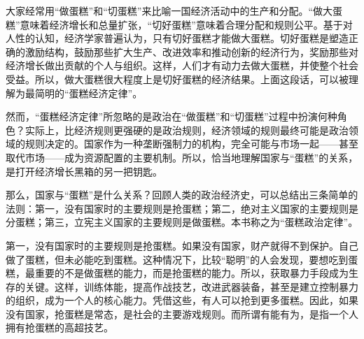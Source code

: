 





大家经常用“做蛋糕”和“切蛋糕”来比喻一国经济活动中的生产和分配。“做大蛋糕”意味着经济增长和总量扩张，“切好蛋糕”意味着合理分配和规则公平。基于对人性的认知，经济学家普遍认为，只有切好蛋糕才能做大蛋糕。切好蛋糕是塑造正确的激励结构，鼓励那些扩大生产、改进效率和推动创新的经济行为，奖励那些对经济增长做出贡献的个人与组织。这样，人们才有动力去做大蛋糕，并使整个社会受益。所以，做大蛋糕很大程度上是切好蛋糕的经济结果。上面这段话，可以被理解为最简明的“蛋糕经济定律”。

然而，“蛋糕经济定律”所忽略的是政治在“做蛋糕”和“切蛋糕”过程中扮演何种角色？实际上，比经济规则更强硬的是政治规则，经济领域的规则最终可能是政治领域的规则决定的。国家作为一种垄断强制力的机构，完全可能与市场一起——甚至取代市场——成为资源配置的主要机制。所以，恰当地理解国家与“蛋糕”的关系，是打开经济增长黑箱的另一把钥匙。

那么，国家与“蛋糕”是什么关系？回顾人类的政治经济史，可以总结出三条简单的法则：第一，没有国家时的主要规则是抢蛋糕；第二，绝对主义国家的主要规则是分蛋糕；第三，立宪主义国家的主要规则是做蛋糕。本书称之为“蛋糕政治定律”。

第一，没有国家时的主要规则是抢蛋糕。如果没有国家，财产就得不到保护。自己做了蛋糕，但未必能吃到蛋糕。这种情况下，比较“聪明”的人会发现，要想吃到蛋糕，最重要的不是做蛋糕的能力，而是抢蛋糕的能力。所以，获取暴力手段成为生存的关键。这样，训练体能，提高作战技艺，改进武器装备，甚至是建立控制暴力的组织，成为一个人的核心能力。凭借这些，有人可以抢到更多蛋糕。因此，如果没有国家，抢蛋糕是常态，是社会的主要游戏规则。而所谓有能有为，是指一个人拥有抢蛋糕的高超技艺。

